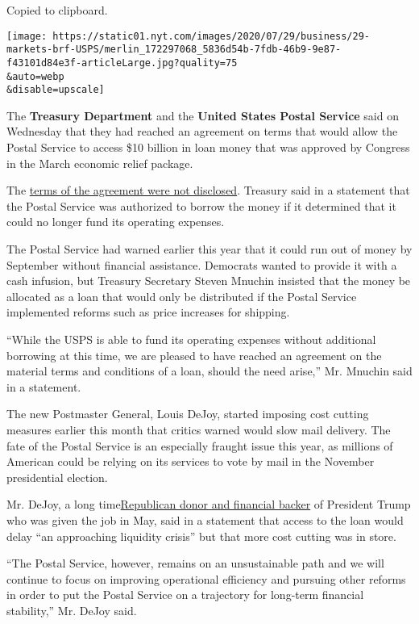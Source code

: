 Copied to clipboard.

\texttt{[image: https://static01.nyt.com/images/2020/07/29/business/29-markets-brf-USPS/merlin\_172297068\_5836d54b-7fdb-46b9-9e87-f43101d84e3f-articleLarge.jpg?quality=75\\\&auto=webp\\\&disable=upscale]}

The \textbf{Treasury Department} and the \textbf{United States Postal
Service} said on Wednesday that they had reached an agreement on terms
that would allow the Postal Service to access \$10 billion in loan money
that was approved by Congress in the March economic relief package.

The \href{https://home.treasury.gov/news/press-releases/sm1071}{terms of
the agreement were not disclosed}. Treasury said in a statement that the
Postal Service was authorized to borrow the money if it determined that
it could no longer fund its operating expenses.

The Postal Service had warned earlier this year that it could run out of
money by September without financial assistance. Democrats wanted to
provide it with a cash infusion, but Treasury Secretary Steven Mnuchin
insisted that the money be allocated as a loan that would only be
distributed if the Postal Service implemented reforms such as price
increases for shipping.

``While the USPS is able to fund its operating expenses without
additional borrowing at this time, we are pleased to have reached an
agreement on the material terms and conditions of a loan, should the
need arise,'' Mr. Mnuchin said in a statement.

The new Postmaster General, Louis DeJoy, started imposing cost cutting
measures earlier this month that critics warned would slow mail
delivery. The fate of the Postal Service is an especially fraught issue
this year, as millions of American could be relying on its services to
vote by mail in the November presidential election.

Mr. DeJoy, a long
time\href{https://www.nytimes.com/2020/05/07/us/politics/postmaster-general-louis-dejoy.html}{Republican
donor and financial backer} of President Trump who was given the job in
May, said in a statement that access to the loan would delay ``an
approaching liquidity crisis'' but that more cost cutting was in store.

``The Postal Service, however, remains on an unsustainable path and we
will continue to focus on improving operational efficiency and pursuing
other reforms in order to put the Postal Service on a trajectory for
long-term financial stability,'' Mr. DeJoy said.

